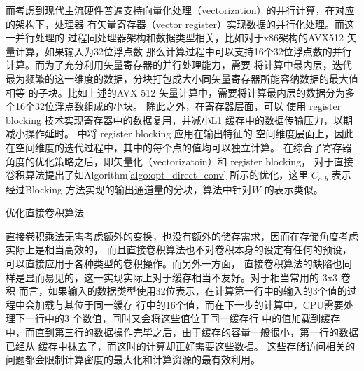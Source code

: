 而考虑到现代主流硬件普遍支持向量化处理（vectorization）的并行计算，在对应的架构下，处理器
有矢量寄存器（vector register）实现数据的并行化处理。而这一并行处理的
过程同处理器架构和数据类型相关，比如对于x86架构的AVX512 矢量计算，如果输入为32位浮点数
那么计算过程中可以支持16个32位浮点数的并行计算。而为了充分利用矢量寄存器的并行处理能力，需要
将计算中最内层，迭代最为频繁的这一维度的数据，分块打包成大小同矢量寄存器所能容纳数据的最大值相等
的子块。比如上述的AVX 512 矢量计算中，需要将计算最内层的数据分为多个16个32位浮点数组成的小块。
除此之外，在寄存器层面，可以
使用 register blocking 技术实现寄存器中的数据复用，并减小L1 缓存中的数据传输压力，以期
减小操作延时。\cite{Georganas2018AnatomyOH} 中将 register blocking 应用在输出特征的
空间维度层面上，因此在空间维度的迭代过程中，其中的每个点的值均可以独立计算。
在综合了寄存器角度的优化策略之后，即矢量化（vectorizatoin）和 register blocking，
\cite{Georganas2018AnatomyOH} 对于直接卷积算法提出了如Algorithm\ref{algo:opt_direct_conv}
所示的优化，这里 $C_{o,b}$ 表示经过Blocking 方法实现的输出通道量的分块，算法中针对$W$ 的表示类似。

\begin{algorithm}
  \caption{优化直接卷积算法}
  \label{algo:opt_direct_conv}
\end{algorithm}

直接卷积乘法无需考虑额外的变换，也没有额外的储存需求，因而在存储角度考虑实际上是相当高效的，
而且直接卷积算法也不对卷积本身的设定有任何的预设，可以直接应用于各种类型的卷积操作。而另外一方面，
直接卷积算法的缺陷也同样是显而易见的，这一实现实际上对于缓存相当不友好。对于相当常用的 3x3 卷积
而言，如果输入的数据类型使用32位表示，在计算第一行中的输入的3个值的过程中会加载与其位于同一缓存
行中的16个值，而在下一步的计算中，CPU需要处理下一行中的3 个数值，同时又会将这些值位于同一缓存行
中的值加载到缓存中，而直到第三行的数据操作完毕之后，由于缓存的容量一般很小，第一行的数据已经从
缓存中抹去了，而这时的计算却正好需要这些数据。 这些存储访问相关的问题都会限制计算密度的最大化和计算资源的最有效利用。

